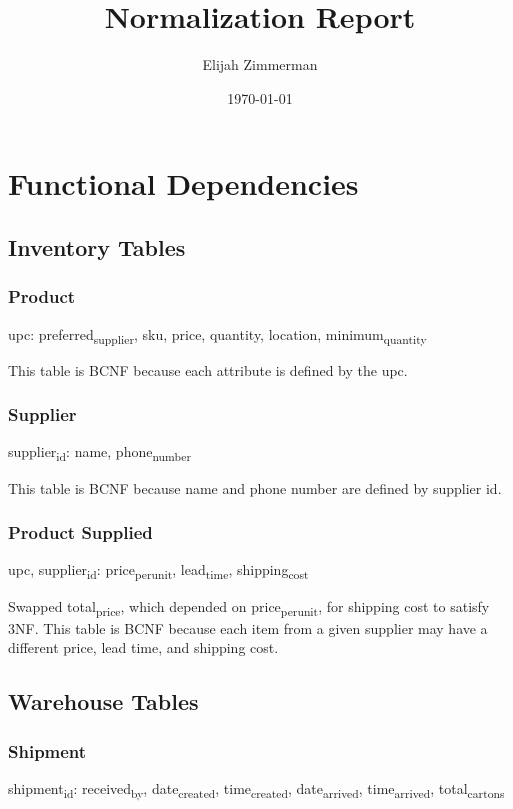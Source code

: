 \documentclass[11pt]{article}
\author{Elijah Zimmerman}
\date{\today}
\title{Normalization Report}
\begin{document}
\maketitle
\tableofcontents

\section{Functional Dependencies}
\label{sec:org188c1d5}
\subsection{Inventory Tables}
\label{sec:org25f1dca}
\subsubsection{Product}
\label{sec:orgdc616a9}
upc: preferred\textsubscript{supplier}, sku, price, quantity, location, minimum\textsubscript{quantity}

This table is BCNF because each attribute is defined by the upc.
\subsubsection{Supplier}
\label{sec:orgf809270}
supplier\textsubscript{id}: name, phone\textsubscript{number}

This table is BCNF because name and phone number are defined by supplier id.
\subsubsection{Product Supplied}
\label{sec:orgf695356}
upc, supplier\textsubscript{id}: price\textsubscript{per}\textsubscript{unit}, lead\textsubscript{time}, shipping\textsubscript{cost}

Swapped total\textsubscript{price}, which depended on price\textsubscript{per}\textsubscript{unit}, for shipping cost to satisfy 3NF.
This table is BCNF because each item from a given supplier may have a different price, lead time, and shipping cost.
\subsection{Warehouse Tables}
\label{sec:orgafdc798}
\subsubsection{Shipment}
\label{sec:org044e952}
shipment\textsubscript{id}: received\textsubscript{by}, date\textsubscript{created}, time\textsubscript{created}, date\textsubscript{arrived}, time\textsubscript{arrived}, total\textsubscript{cartons}
\end{document}
